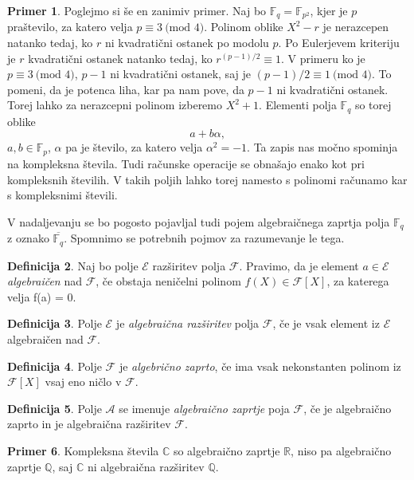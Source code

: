 \documentclass[12pt,a4paper,twoside]{article}
\theoremstyle{definition} %
\newtheorem{definicija}{Definicija}[section]
\newtheorem{primer}[definicija]{Primer}
\theoremstyle{plain} %
\numberwithin{equation}{section}  %
\newcommand{\R}{\mathbb R}
\renewcommand{\C}{\mathbb C}
\newcommand{\Q}{\mathbb Q}
\newcommand{\F}{\mathbb F}
\newcommand{\MOD}[1]{\ \text{(mod }{#1}\text{)}}
\begin{document}
\begin{primer}
Poglejmo si še en zanimiv primer. Naj bo $\F_q= \F_{p^2}$, kjer je $p$ praštevilo, za katero velja $p \equiv 3 \MOD{4}$.  Polinom oblike $X^2-r$ je nerazcepen natanko tedaj, ko $r$ ni kvadratični ostanek po modolu $p$. Po  Eulerjevem kriteriju \cite{Eulerkriterij} je $r$ kvadratični ostanek natanko tedaj, ko $r^{(p-1)/2} \equiv 1$. V primeru ko je $p \equiv 3 \MOD{4}$, $p-1$ ni kvadratični ostanek, saj je $(p-1)/2 \equiv 1 \MOD{4}$. To pomeni, da je potenca liha, kar pa nam pove, da $p-1$ ni kvadratični ostanek. Torej lahko za nerazcepni polinom izberemo $X^2+1$. Elementi polja $\F_q$ so torej oblike
$$a+b\alpha,$$
$a,b \in \F_p$, $\alpha$ pa je število, za katero velja $\alpha^2 = -1$. Ta zapis nas močno spominja na kompleksna števila. Tudi računske operacije se obnašajo enako kot pri kompleksnih številih. V takih poljih lahko torej namesto s polinomi računamo kar s kompleksnimi števili.
\end{primer}

V nadaljevanju se bo pogosto pojavljal tudi pojem algebraičnega zaprtja polja $\F_q$ z oznako $\overline{\F_q}$. Spomnimo se potrebnih pojmov za razumevanje le tega.

\begin{definicija}
Naj bo polje $\mathcal{E}$ razširitev polja $\mathcal{F}$. Pravimo, da je element $a \in \mathcal{E}$ \emph{algebraičen}
nad $\mathcal{F}$, če obstaja neničelni polinom $f(X) \in \mathcal{F}[X]$, za katerega velja f(a) = 0.

\end{definicija}

\begin{definicija}
Polje $\mathcal{E}$ je \emph{algebraična razširitev} polja $\mathcal{F}$, če je vsak element
iz $\mathcal{E}$ algebraičen nad $\mathcal{F}$.
\end{definicija}

\begin{definicija}
Polje $\mathcal{F}$ je \emph{algebrično zaprto}, če ima vsak nekonstanten polinom
iz $\mathcal{F} [X]$ vsaj eno ničlo v $\mathcal{F}$.
\end{definicija}

\begin{definicija}
Polje $\mathcal{A}$ se imenuje \emph{algebraično zaprtje} poja $\mathcal{F}$, če je algebraično
zaprto in je algebraična razširitev $\mathcal{F}$.
\end{definicija}


\begin{primer}
Kompleksna števila $\C$ so algebraično zaprtje $\R$, niso pa algebraično zaprtje $\Q$, saj $\C$ ni algebraična razširitev $\Q$.

\end{primer}
\end{document}
